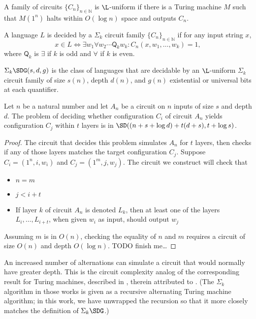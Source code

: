 \documentclass{article}
\newcommand{\Q}{\mathsf{Q}}
\begin{document}
A family of circuits $\{C_n\}_{n \in \mathbb{N}}$ is $\L$-uniform if there is a Turing machine $M$ such that $M(1^n)$ halts within $O(\log n)$ space and outputs $C_n$.

\begin{definition}
  A language $L$ is decided by a $\Sigma_k$ circuit family $\{C_n\}_{n \in \mathbb{N}}$ if for any input string $x$,
  \begin{equation*}
    x \in L \iff \exists w_1 \forall w_2 \dotsb \Q_k w_k \colon C_n(x, w_1, \dotsc, w_k) = 1,
  \end{equation*}
  where $\Q_k$ is $\exists$ if $k$ is odd and $\forall$ if $k$ is even.
\end{definition}

\begin{definition}
  $\Sigma_k \SDG(s, d, g)$ is the class of languages that are decidable by an $\L$-uniform $\Sigma_k$ circuit family of size $s(n)$, depth $d(n)$, and $g(n)$ existential or universal bits at each quantifier.
\end{definition}

\begin{lemma}\label{lem:yields}
  Let $n$ be a natural number and let $A_n$ be a circuit on $n$ inputs of size $s$ and depth $d$.
  The problem of deciding whether configuration $C_i$ of circuit $A_n$ yields configuration $C_j$ within $t$ layers is in $\SD((n + s + \log d) + t(d + s), t + \log s)$.
\end{lemma}
\begin{proof}
  The circuit that decides this problem simulates $A_n$ for $t$ layers, then checks if any of those layers matches the target configuration $C_j$.
  Suppose $C_i = (1^n, i, w_i)$ and $C_j = (1^m, j, w_j)$.
  The circuit we construct will check that
  \begin{itemize}
  \item $n = m$
  \item $j < i + t$
  \item If layer $k$ of circuit $A_n$ is denoted $L_k$, then at least one of the layers $L_i, \dotsc, L_{i + t}$, when given $w_i$ as input, should output $w_j$
  \end{itemize}
  Assuming $m$ is in $O(n)$, checking the equality of $n$ and $m$ requires a circuit of size $O(n)$ and depth $O(\log n)$.
  TODO finish me\ldots
\end{proof}

An increased number of alternations can simulate a circuit that would normally have greater depth.
This is the circuit complexity analog of the corresponding result for Turing machines, described in \autocite[Lemma~2.7]{williams06}, therein attributed to \autocite[Theorem~5.1]{fvm00}.
(The $\Sigma_k$ algorithm in those works is given as a recursive alternating Turing machine algorithm; in this work, we have unwrapped the recursion so that it more closely matches the definition of $\Sigma_k \SDG$.)
\end{document}
